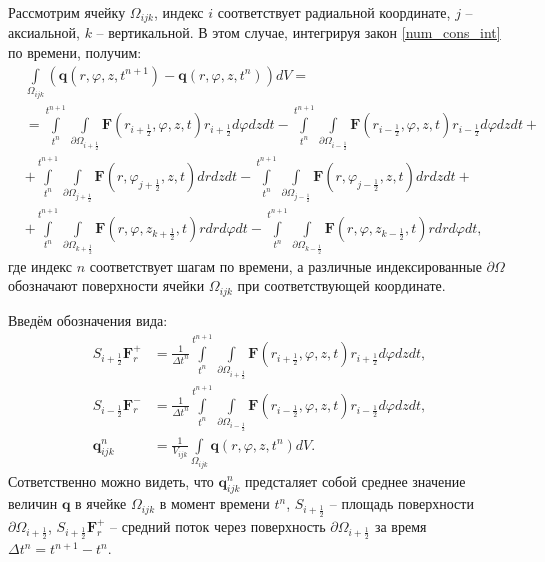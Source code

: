 	Рассмотрим ячейку $\Omega_{ijk}$, индекс $i$ соответствует радиальной координате, $j$ -- аксиальной, $k$ -- вертикальной. В этом случае, интегрируя закон \eqref{num_cons_int} по времени, получим:
\begin{align}
	\label{num_law1}
	&\int\limits_{\Omega_{ijk}}\left(\boldsymbol{q}(r, \varphi, z, t^{n+1})-\boldsymbol{q}(r, \varphi, z, t^{n})\right)dV =\nonumber\\
	&=\int\limits_{t^n}^{t^{n+1}}\int\limits_{\partial\Omega_{i+\frac{1}{2}}}\boldsymbol{F}(r_{i+\frac{1}{2}}, \varphi, z, t)r_{i+\frac{1}{2}}d\varphi dzdt
	-\int\limits_{t^n}^{t^{n+1}}\int\limits_{\partial\Omega_{i-\frac{1}{2}}}\boldsymbol{F}(r_{i-\frac{1}{2}}, \varphi, z, t)r_{i-\frac{1}{2}}d\varphi dzdt+\nonumber\\
	&+\int\limits_{t^n}^{t^{n+1}}\int\limits_{\partial\Omega_{j+\frac{1}{2}}}\boldsymbol{F}(r, \varphi_{j+\frac{1}{2}}, z, t)drdzdt
	-\int\limits_{t^n}^{t^{n+1}}\int\limits_{\partial\Omega_{j-\frac{1}{2}}}\boldsymbol{F}(r, \varphi_{j-\frac{1}{2}}, z, t)drdzdt+\nonumber\\
	&+\int\limits_{t^n}^{t^{n+1}}\int\limits_{\partial\Omega_{k+\frac{1}{2}}}\boldsymbol{F}(r, \varphi, z_{k+\frac{1}{2}}, t)rdrd\varphi dt
	-\int\limits_{t^n}^{t^{n+1}}\int\limits_{\partial\Omega_{k-\frac{1}{2}}}\boldsymbol{F}(r, \varphi, z_{k-\frac{1}{2}}, t)rdrd\varphi dt,
\end{align}
	где индекс $n$ соответствует шагам по времени, 
	а различные индексированные $\partial\Omega$ обозначают поверхности ячейки $\Omega_{ijk}$ при соответствующей координате.

	Введём обозначения вида:
\begin{align}
	\label{num_terms2}
	S_{i+\frac{1}{2}}\boldsymbol{F}_r^{+} &= \frac{1}{\Delta t^n} \int\limits_{t^n}^{t^{n+1}}\int\limits_{\partial\Omega_{i+\frac{1}{2}}}\boldsymbol{F}(r_{i+\frac{1}{2}}, \varphi, z, t)r_{i+\frac{1}{2}}d\varphi dzdt,\\
	S_{i-\frac{1}{2}}\boldsymbol{F}_r^{-} &= \frac{1}{\Delta t^n} \int\limits_{t^n}^{t^{n+1}}\int\limits_{\partial\Omega_{i-\frac{1}{2}}}\boldsymbol{F}(r_{i-\frac{1}{2}}, \varphi, z, t)r_{i-\frac{1}{2}}d\varphi dzdt,\\
	\boldsymbol{q}_{ijk}^{n} &= \frac{1}{V_{ijk}}\int\limits_{\Omega_{ijk}}\boldsymbol{q}(r, \varphi, z, t^{n})dV.
\end{align}
	Сответственно можно видеть, что $\boldsymbol{q}_{ijk}^n$ предсталяет собой среднее значение величин $\boldsymbol{q}$ в ячейке $\Omega_{ijk}$ в момент времени $t^n$, 
	$S_{i+\frac{1}{2}}$ -- площадь поверхности $\partial\Omega_{i+\frac{1}{2}}$,
	$S_{i+\frac{1}{2}}\boldsymbol{F}_r^{+}$ -- средний поток через поверхность $\partial\Omega_{i+\frac{1}{2}}$ за время $\Delta t^n = t^{n+1}-t^n$.
	
